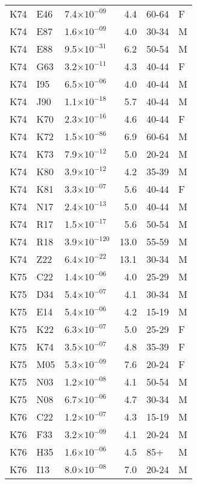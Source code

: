 \begin{longtable}{lllrll}
   K74 & E46 & 7.4$\times10^{-09}$ & 4.4 & 60-64 & F \\ 
   K74 & E87 & 1.6$\times10^{-09}$ & 4.0 & 30-34 & M \\ 
   K74 & E88 & 9.5$\times10^{-31}$ & 6.2 & 50-54 & M \\ 
   K74 & G63 & 3.2$\times10^{-11}$ & 4.3 & 40-44 & F \\ 
   K74 & I95 & 6.5$\times10^{-06}$ & 4.0 & 40-44 & M \\ 
   K74 & J90 & 1.1$\times10^{-18}$ & 5.7 & 40-44 & M \\ 
   K74 & K70 & 2.3$\times10^{-16}$ & 4.6 & 40-44 & F \\ 
   K74 & K72 & 1.5$\times10^{-86}$ & 6.9 & 60-64 & M \\ 
   K74 & K73 & 7.9$\times10^{-12}$ & 5.0 & 20-24 & M \\ 
   K74 & K80 & 3.9$\times10^{-12}$ & 4.2 & 35-39 & M \\ 
   K74 & K81 & 3.3$\times10^{-07}$ & 5.6 & 40-44 & F \\ 
   K74 & N17 & 2.4$\times10^{-13}$ & 5.0 & 40-44 & M \\ 
   K74 & R17 & 1.5$\times10^{-17}$ & 5.6 & 50-54 & M \\ 
   K74 & R18 & 3.9$\times10^{-120}$ & 13.0 & 55-59 & M \\ 
   K74 & Z22 & 6.4$\times10^{-22}$ & 13.1 & 30-34 & M \\ 
   K75 & C22 & 1.4$\times10^{-06}$ & 4.0 & 25-29 & M \\ 
   K75 & D34 & 5.4$\times10^{-07}$ & 4.1 & 30-34 & M \\ 
   K75 & E14 & 5.4$\times10^{-06}$ & 4.2 & 15-19 & M \\ 
   K75 & K22 & 6.3$\times10^{-07}$ & 5.0 & 25-29 & F \\ 
   K75 & K74 & 3.5$\times10^{-07}$ & 4.8 & 35-39 & F \\ 
   K75 & M05 & 5.3$\times10^{-09}$ & 7.6 & 20-24 & F \\ 
   K75 & N03 & 1.2$\times10^{-08}$ & 4.1 & 50-54 & M \\ 
   K75 & N08 & 6.7$\times10^{-06}$ & 4.7 & 30-34 & M \\ 
   K76 & C22 & 1.2$\times10^{-07}$ & 4.3 & 15-19 & M \\ 
   K76 & F33 & 3.2$\times10^{-09}$ & 4.1 & 20-24 & M \\ 
   K76 & H35 & 1.6$\times10^{-06}$ & 4.5 & 85+ & M \\ 
   K76 & I13 & 8.0$\times10^{-08}$ & 7.0 & 20-24 & M \\ 

\end{longtable}

